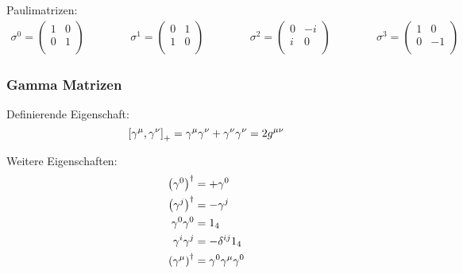 \documentclass[11pt]{article}
\numberwithin{equation}{section}
\begin{document}
			\noindent
			Paulimatrizen:
			\begin{equation}
				\begin{aligned}
					\sigma^0 = \left(\begin{matrix}
						1 & 0 \\
						0 & 1 \\
					\end{matrix}\right) &&\hspace{30pt}
					\sigma^1 = \left(\begin{matrix}
						0 & 1 \\
						1 & 0 \\
					\end{matrix}\right) &&\hspace{30pt}
					\sigma^2 = \left(\begin{matrix}
						0 & -i \\
							i & 0 \\
					\end{matrix}\right) &&\hspace{30pt}
					\sigma^3 = \left(\begin{matrix}
						1 & 0 \\
						0 & -1 \\
					\end{matrix}\right)
				\end{aligned}
			\end{equation}

			\subsubsection{Gamma Matrizen}
				\noindent
				Definierende Eigenschaft:
				\begin{equation}
					\left[\gamma^\mu,\gamma^\nu\right]_{+} = \gamma^\mu \gamma^\nu + \gamma^\nu \gamma^\nu = 2g^{\mu\nu}
				\end{equation}

				\noindent
				Weitere Eigenschaften:
				\begin{equation}
					\begin{aligned}
						\Br{\gamma^0}^\dagger &= +\gamma^0 \\
						\Br{\gamma^j}^\dagger &= -\gamma^j \\
						\gamma^0 \gamma^0 &= 1_4 \\ %
						\gamma^i \gamma^j &= - \delta^{ij} 1_4 \\
						\Br{\gamma^\mu}^\dagger &= \gamma^0 \gamma^\mu \gamma^0 \\
					\end{aligned}
				\end{equation}
\end{document}
